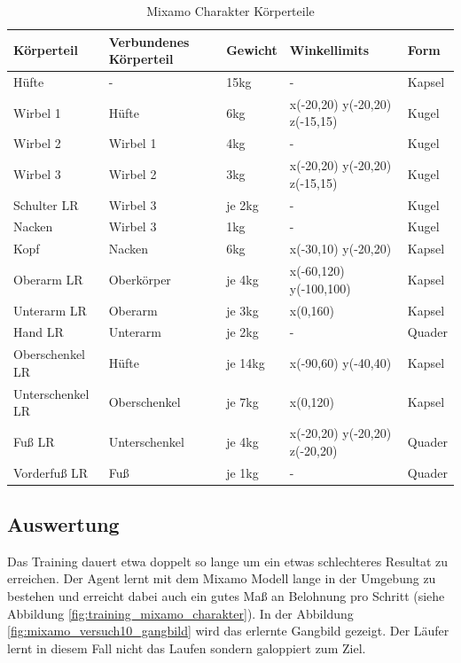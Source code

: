 \begin{table}[H]
  \centering
  {
  \begin{tabular}{ |p{3cm}|p{3cm}|p{2cm}|p{4cm}|p{2cm}| }
  \hline
  \textbf{Körpertei}l& \textbf{Verbundenes Körperteil} & \textbf{Gewicht} & \textbf{Winkellimits} & \textbf{Form} \\
  \hline
  Hüfte & - & 15kg & - & Kapsel \\
  \hline
  Wirbel 1 & Hüfte & 6kg & x(-20,20) y(-20,20) z(-15,15) & Kugel \\
  \hline
  Wirbel 2 & Wirbel 1 & 4kg & - & Kugel \\
  \hline
  Wirbel 3 & Wirbel 2 & 3kg & x(-20,20) y(-20,20) z(-15,15) & Kugel \\
  \hline
  Schulter LR & Wirbel 3 & je 2kg& - & Kugel \\
  \hline
  Nacken & Wirbel 3 & 1kg & - & Kugel \\
  \hline
  Kopf & Nacken & 6kg & x(-30,10) y(-20,20) & Kapsel \\
  \hline
  Oberarm LR & Oberkörper & je 4kg & x(-60,120) y(-100,100) & Kapsel \\
  \hline
  Unterarm LR & Oberarm & je 3kg & x(0,160) & Kapsel \\
  \hline
  Hand LR & Unterarm & je 2kg & - & Quader \\
  \hline
  Oberschenkel LR & Hüfte & je 14kg& x(-90,60) y(-40,40) & Kapsel \\
  \hline
  Unterschenkel LR & Oberschenkel & je 7kg &  x(0,120) & Kapsel \\
  \hline
  Fuß LR & Unterschenkel & je 4kg & x(-20,20) y(-20,20) z(-20,20) & Quader \\
  \hline
  Vorderfuß LR & Fuß & je 1kg & - & Quader \\
  \hline
  \end{tabular}}
  \caption{Mixamo Charakter Körperteile}
  \label{table:mixamo_körperteile}
\end{table}

\subsection{Auswertung}
Das Training dauert etwa doppelt so lange um ein etwas schlechteres Resultat zu erreichen. Der Agent lernt mit dem Mixamo Modell lange in der Umgebung zu bestehen und erreicht dabei auch ein gutes Maß an Belohnung pro Schritt (siehe Abbildung \ref{fig:training_mixamo_charakter}). In der Abbildung \ref{fig:mixamo_versuch10_gangbild} wird das erlernte Gangbild gezeigt. Der Läufer lernt in diesem Fall nicht das Laufen sondern galoppiert zum Ziel.

